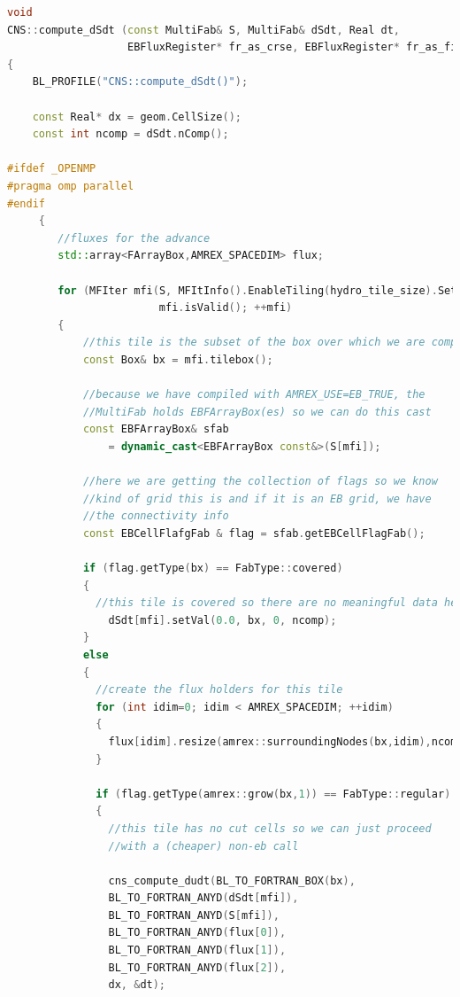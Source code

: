 \begin{lstlisting}[language=cpp]
void
CNS::compute_dSdt (const MultiFab& S, MultiFab& dSdt, Real dt,
                   EBFluxRegister* fr_as_crse, EBFluxRegister* fr_as_fine)
{
    BL_PROFILE("CNS::compute_dSdt()");

    const Real* dx = geom.CellSize();
    const int ncomp = dSdt.nComp();

#ifdef _OPENMP
#pragma omp parallel
#endif
     {
        //fluxes for the advance
        std::array<FArrayBox,AMREX_SPACEDIM> flux;

        for (MFIter mfi(S, MFItInfo().EnableTiling(hydro_tile_size).SetDynamic(true));
                        mfi.isValid(); ++mfi)
        {
            //this tile is the subset of the box over which we are computing
            const Box& bx = mfi.tilebox();

            //because we have compiled with AMREX_USE=EB_TRUE, the
            //MultiFab holds EBFArrayBox(es) so we can do this cast
            const EBFArrayBox& sfab
                = dynamic_cast<EBFArrayBox const&>(S[mfi]);
            
            //here we are getting the collection of flags so we know
            //kind of grid this is and if it is an EB grid, we have
            //the connectivity info
            const EBCellFlafgFab & flag = sfab.getEBCellFlagFab();

            if (flag.getType(bx) == FabType::covered) 
            {
              //this tile is covered so there are no meaningful data here
                dSdt[mfi].setVal(0.0, bx, 0, ncomp);
            } 
            else 
            {
              //create the flux holders for this tile
              for (int idim=0; idim < AMREX_SPACEDIM; ++idim) 
              {
                flux[idim].resize(amrex::surroundingNodes(bx,idim),ncomp);
              }

              if (flag.getType(amrex::grow(bx,1)) == FabType::regular)
              {
                //this tile has no cut cells so we can just proceed
                //with a (cheaper) non-eb call

                cns_compute_dudt(BL_TO_FORTRAN_BOX(bx),
                BL_TO_FORTRAN_ANYD(dSdt[mfi]),
                BL_TO_FORTRAN_ANYD(S[mfi]),
                BL_TO_FORTRAN_ANYD(flux[0]),
                BL_TO_FORTRAN_ANYD(flux[1]),
                BL_TO_FORTRAN_ANYD(flux[2]),
                dx, &dt);


\end{lstlisting}

